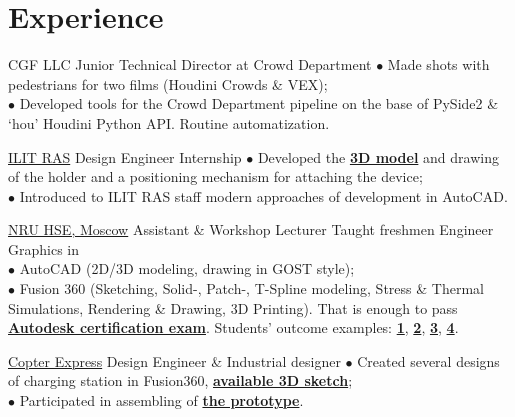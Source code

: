 \documentclass[]{cv-class}
\begin{document}
\begin{minipage}[t]{0.6\textwidth} 

\section{Experience}
    {CGF LLC}
    {Junior Technical Director at Crowd Department}
    {\textcolor{bullet_col}{$\bullet$} Made shots with pedestrians for two films (Houdini Crowds \& VEX); \\
    \textcolor{bullet_col}{$\bullet$} Developed tools for the Crowd Department pipeline on the base of PySide2 \& `hou' Houdini Python API. Routine automatization.
    \\
    }

    {\href{https://crys.ras.ru}{ILIT RAS}}
    {Design Engineer Internship}
    {\textcolor{bullet_col}{$\bullet$} Developed the \href{https://myhub.autodesk360.com/ue2971508/g/shares/SHabee1QT1a327cf2b7ada7a5a5e1c2f10c0}{\textbf{3D model}} and drawing of the holder and a positioning mechanism for attaching the device;\\
    \textcolor{bullet_col}{$\bullet$} Introduced to ILIT RAS staff modern approaches of development in AutoCAD.
    \\}

    {\href{https://www.hse.ru/en/}{NRU HSE, Moscow}}
    {Assistant \& Workshop Lecturer}
    {Taught freshmen Engineer Graphics in\\
    \textcolor{bullet_col}{$\bullet$} AutoCAD (2D/3D modeling, drawing in GOST style); \\
    \textcolor{bullet_col}{$\bullet$} Fusion 360 (Sketching, Solid-, Patch-, T-Spline modeling, Stress \& Thermal Simulations, Rendering \& Drawing, 3D Printing). That is enough to pass  \href{http://downloads.certiport.com/marketing/Autodesk/doc/ACU_Fusion_360.pdf}{\textbf{Autodesk certification exam}}. Students' outcome  examples: \href{https://gallery.autodesk.com/projects/mountain-bike-2}{\textbf{1}}, \href{https://gallery.autodesk.com/projects/corvette-c6}{\textbf{2}}, \href{https://gallery.autodesk.com/projects/stranded-beast}{\textbf{3}}, \href{https://gallery.autodesk.com/projects/star-wars-arc-170}{\textbf{4}}.
    \\}

    {\href{https://copterexpress.com/}{Copter Express}}
    {Design Engineer \& Industrial designer}
    {\textcolor{bullet_col}{$\bullet$} Created several designs of charging station in Fusion360, \href{https://myhub.autodesk360.com/ue2971508/shares/public/SHabee1QT1a327cf2b7a7d7742f9b8a0285b}{\textbf{available 3D sketch}}; \\
    \textcolor{bullet_col}{$\bullet$} Participated in assembling of \href{https://www.youtube.com/watch?v=RjX6nUqw1mI}{\textbf{the prototype}}.
    }


\end{minipage}
\end{document}
